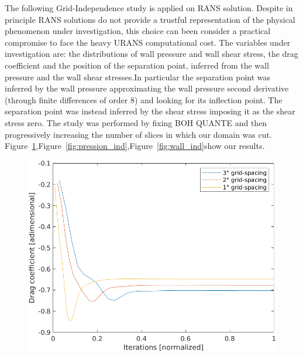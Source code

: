 \documentclass[12pt]{article}
\begin{document}
The following Grid-Independence study is applied on RANS solution.   Despite in principle RANS solutions do not provide a trustful representation of the physical phenomenon under investigation, this choice can been consider a practical compromise to face the heavy URANS  computational cost. The variables under investigation are:  the distributions of wall pressure and wall shear stress, the drag coefficient and the position of the separation point, inferred from the wall pressure and the wall shear stresses.In particular the separation point was inferred by the wall pressure approximating the wall pressure second derivative (through finite differences of order 8) and looking for its inflection point. The separation point was instead inferred by the shear stress imposing it as the shear stress zero.
The study was performed by fixing BOH QUANTE and then progressively increasing the number of slices in which our domain was cut.
Figure~\ref{fig:drag_independence},Figure~\ref{fig:pression_ind},Figure~\ref{fig:wall_ind}show our results.
        \begin{figure}[!ht]
                \includegraphics[width=\textwidth]{DragCoefficient_Independence.png}
                \centering
                \caption{}
                \label{fig:drag_independence}
        \end{figure}
\end{document}
